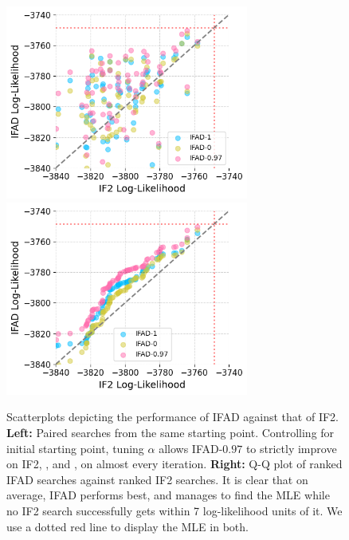 \documentclass[11pt]{article}
\newcommand\arxiv[2]{#1} %
\begin{document}
\begin{figure}[htbp!]
    \includegraphics[width=\arxiv{8cm}{\textwidth/\real{4.2}}]{../imgs/095/pairs.png}
    \includegraphics[width=\arxiv{8cm}{\textwidth/\real{4.2}}]{../imgs/095/qq.png}
    \caption{Scatterplots depicting the performance of IFAD against that of IF2. \textbf{Left:} Paired searches from the same starting point. Controlling for initial starting point, tuning $\alpha$ allows IFAD-$0.97$ to strictly improve on IF2, \cite{poyiadjis11}, and \cite{naesseth18}, on almost every iteration. \textbf{Right:} Q-Q plot of ranked IFAD searches against ranked IF2 searches. It is clear that on average, IFAD performs best, and manages to find the MLE while no IF2 search successfully gets within 7 log-likelihood units of it. We use a dotted red line to display the MLE in both. }
    \label{fig:scatter-optim}
\end{figure}
\end{document}
